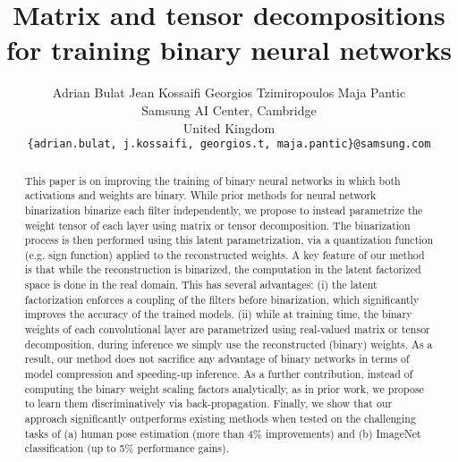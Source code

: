 \documentclass[10pt,twocolumn,letterpaper]{article}
\begin{document}
\title{Matrix and tensor decompositions for training binary neural networks}



\author{Adrian Bulat \qquad Jean Kossaifi \qquad Georgios Tzimiropoulos \qquad Maja Pantic
        \vspace{5pt}\\
		Samsung AI Center, Cambridge\\
		United Kingdom\\
		{\tt\small \{adrian.bulat, j.kossaifi, georgios.t, maja.pantic\}@samsung.com}
		}

\maketitle


\begin{abstract}

   
   This paper is on improving the training of binary neural networks in which both activations and weights are binary. 
  While prior methods for neural network binarization binarize each filter independently,
  we propose to instead parametrize the weight tensor of each layer using matrix or tensor decomposition.
  The binarization process is then performed using this latent parametrization, via a quantization function (e.g. sign function) applied to the reconstructed weights.
  A key feature of our method is that while the reconstruction is binarized, the computation in the latent factorized space is done in the real domain. 
  This has several advantages:
  (i) the latent factorization enforces a coupling of the filters before binarization, which significantly improves the accuracy of the trained models. 
  (ii) while at training time, the binary weights of each convolutional layer are parametrized using real-valued matrix or tensor decomposition, during inference we simply use the reconstructed (binary) weights. 
  As a result, our method does not sacrifice any advantage of binary networks in terms of model compression and speeding-up inference. 
  As a further contribution, instead of computing the binary weight scaling factors analytically, as in prior work, we propose to learn them discriminatively via back-propagation. 
  Finally, we show that our approach significantly outperforms existing methods when tested on the challenging tasks of (a) human pose estimation (more than 4\% improvements) and (b) ImageNet classification (up to 5\% performance gains).

\end{abstract}
\end{document}
